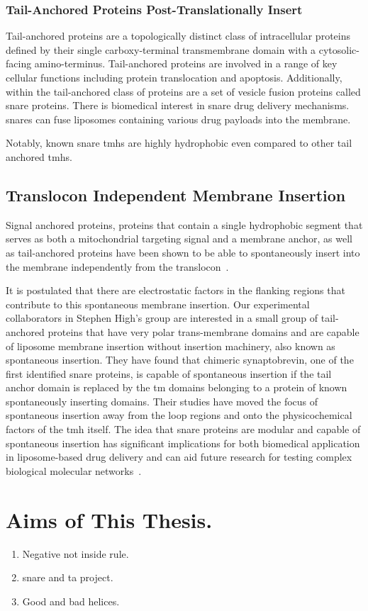 \subsubsection{Tail-Anchored Proteins Post-Translationally Insert}

Tail-anchored proteins are a topologically distinct class of intracellular proteins defined by their single carboxy-terminal transmembrane domain with a cytosolic-facing amino-terminus. Tail-anchored proteins are involved in a range of key cellular functions including protein translocation and apoptosis. Additionally, within the tail-anchored class of proteins are a set of vesicle fusion proteins called \gls{snare} proteins. There is biomedical interest in \gls{snare} drug delivery mechanisms. \gls{snare}s can fuse liposomes containing various drug payloads into the membrane.

Notably, known \gls{snare} \gls{tmh}s are highly hydrophobic even compared to other tail anchored \gls{tmh}s.

\subsection{Translocon Independent Membrane Insertion}
Signal anchored proteins, proteins that contain a single hydrophobic segment that serves as both a mitochondrial targeting signal and a membrane anchor, as well as tail-anchored proteins have been shown to be able to spontaneously insert into the membrane independently from the translocon~\cite{Elisa2012, Lan2000, Colombo2009}.

It is postulated that there are electrostatic factors in the flanking regions that contribute to this spontaneous membrane insertion. Our experimental collaborators in Stephen High’s group are interested in a small group of tail-anchored proteins that have very polar trans-membrane domains and are capable of liposome membrane insertion without insertion machinery, also known as spontaneous insertion. They have found that chimeric synaptobrevin, one of the first identified \gls{snare} proteins, is capable of spontaneous insertion if the tail anchor domain is replaced by the \gls{tm} domains belonging to a protein of known spontaneously inserting domains. Their studies have moved the focus of spontaneous insertion away from the loop regions and onto the physicochemical factors of the \gls{tmh} itself. The idea that \gls{snare} proteins are modular and capable of spontaneous insertion has significant implications for both biomedical application in liposome-based drug delivery and can aid future research for testing complex biological molecular networks~\cite{Allen2013, Nordlund2014}.


\section{Aims of This Thesis.}

\begin{enumerate}
  \item Negative not inside rule.
  \item \gls{snare} and \gls{ta} project.
  \item Good and bad helices.
\end{enumerate}
